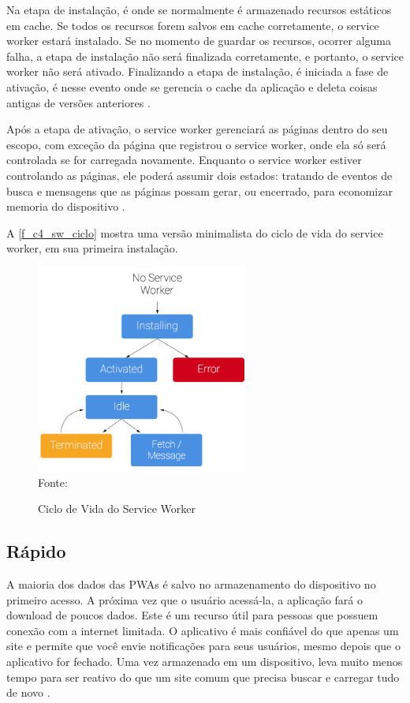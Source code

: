 Na etapa de instalação, é onde se normalmente é armazenado recursos estáticos em cache. Se todos os recursos forem salvos em cache corretamente, o service worker estará instalado. Se no momento de guardar os recursos, ocorrer alguma falha, a etapa de instalação não será finalizada corretamente, e portanto, o service worker não será ativado. Finalizando a etapa de instalação, é iniciada a fase de ativação, é nesse evento onde se gerencia o cache da aplicação e deleta coisas antigas de versões anteriores \cite{servicework}.

Após a etapa de ativação, o service worker gerenciará as páginas dentro do seu escopo, com exceção da página que registrou o service worker, onde ela só será controlada se for carregada novamente. Enquanto o service worker estiver controlando as páginas, ele poderá assumir dois estados: tratando de eventos de busca e mensagens que as páginas possam gerar, ou encerrado, para economizar memoria do dispositivo \cite{servicework}.


A \autoref{f_c4_sw_ciclo} mostra uma versão minimalista do ciclo de vida do service worker, em sua primeira instalação.
\newpage
\begin{figure}[!htpb]
	\centering
	\caption{Ciclo de Vida do Service Worker}
	\includegraphics[width=7cm]{images/sw-lifecycle.png}\\
	Fonte:\cite{servicework}
 	\label{f_c4_sw_ciclo}
\end{figure}

\subsection{Rápido}
A maioria dos dados das \ac{PWA}s é salvo no armazenamento do dispositivo no primeiro acesso. A próxima vez que o usuário acessá-la, a aplicação fará o download de poucos dados. Este é um recurso útil para pessoas que possuem conexão com a internet limitada. O aplicativo é mais confiável do que apenas um site e permite que você envie notificações para seus usuários, mesmo depois que o aplicativo for fechado. Uma vez armazenado em um dispositivo, leva muito menos tempo para ser reativo do que um site comum que precisa buscar e carregar tudo de novo \cite{memoir}.

